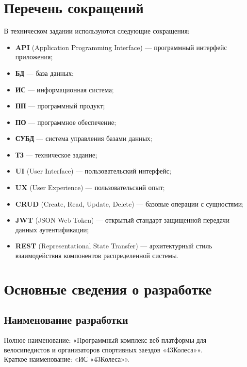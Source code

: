 \documentclass[a4paper,12pt]{article}
\begin{document}
\section{Перечень сокращений}

В техническом задании используются следующие сокращения:
\begin{itemize}
	\item \textbf{API} (Application Programming Interface) — программный интерфейс приложения;
	\item \textbf{БД} — база данных;
	\item \textbf{ИС} — информационная система;
	\item \textbf{ПП} — программный продукт;
	\item \textbf{ПО} — программное обеспечение;
	\item \textbf{СУБД} — система управления базами данных;
	\item \textbf{ТЗ} — техническое задание;
	\item \textbf{UI} (User Interface) — пользовательский интерфейс;
	\item \textbf{UX} (User Experience) — пользовательский опыт;
	\item \textbf{CRUD} (Create, Read, Update, Delete) — базовые операции с сущностями;
	\item \textbf{JWT} (JSON Web Token) — открытый стандарт защищенной передачи данных аутентификации;
	\item \textbf{REST} (Representational State Transfer) — архитектурный стиль взаимодействия компонентов распределенной системы.
\end{itemize}

\section{Основные сведения о разработке}

\subsection{Наименование разработки}
Полное наименование: «Программный комплекс веб-платформы для велосипедистов и организаторов спортивных заездов «43Колеса»».\\
Краткое наименование: «ИС «43Колеса»».
\end{document}
